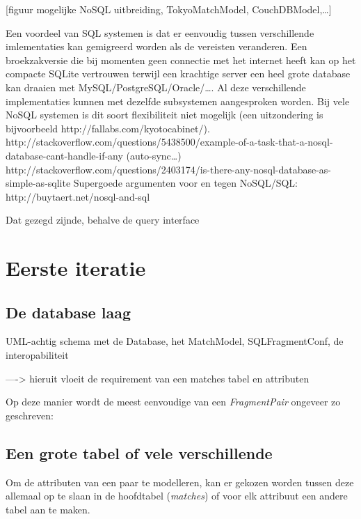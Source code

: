 [figuur mogelijke NoSQL uitbreiding, TokyoMatchModel, CouchDBModel,\ldots] 

Een voordeel van SQL systemen is dat er eenvoudig tussen verschillende imlementaties kan gemigreerd worden als de vereisten veranderen. Een broekzakversie die bij momenten geen connectie met het internet heeft kan op het compacte SQLite vertrouwen terwijl een krachtige server een heel grote database kan draaien met MySQL/PostgreSQL/Oracle/\ldots. Al deze verschillende implementaties kunnen met dezelfde subsystemen aangesproken worden. Bij vele NoSQL systemen is dit soort flexibiliteit niet mogelijk (een uitzondering is bijvoorbeeld http://fallabs.com/kyotocabinet/).\\

http://stackoverflow.com/questions/5438500/example-of-a-task-that-a-nosql-database-cant-handle-if-any (auto-sync\ldots)
http://stackoverflow.com/questions/2403174/is-there-any-nosql-database-as-simple-as-sqlite
Supergoede argumenten voor en tegen NoSQL/SQL: http://buytaert.net/nosql-and-sql

Dat gezegd zijnde, behalve de query interface

\section{Eerste iteratie}

\subsection{De database laag}

UML-achtig schema met de Database, het MatchModel, SQLFragmentConf, de interopabiliteit

----> hieruit vloeit de requirement van een matches tabel en attributen

Op deze manier wordt de meest eenvoudige van een \emph{FragmentPair} ongeveer zo geschreven:



\subsection{Een grote tabel of vele verschillende}

Om de attributen van een paar te modelleren, kan er gekozen worden tussen deze allemaal op te slaan in de hoofdtabel (\emph{matches}) of voor elk attribuut een andere tabel aan te maken.

